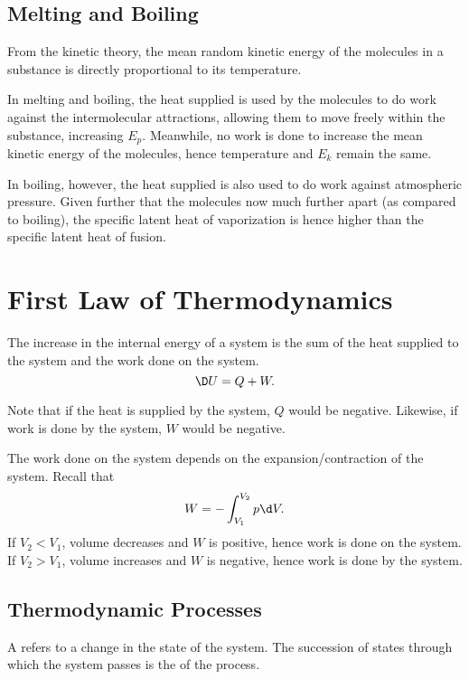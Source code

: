 \subsection{Melting and Boiling}

From the kinetic theory, the mean random kinetic energy of the molecules in a substance is directly proportional to its temperature.

In melting and boiling, the heat supplied is used by the molecules to do work against the intermolecular attractions, allowing them to move freely within the substance, increasing $E_p$. Meanwhile, no work is done to increase the mean kinetic energy of the molecules, hence temperature and $E_k$ remain the same.

In boiling, however, the heat supplied is also used to do work against atmospheric pressure. Given further that the molecules now much further apart (as compared to boiling), the specific latent heat of vaporization is hence higher than the specific latent heat of fusion.

\section{First Law of Thermodynamics}

\begin{law}
    The increase in the internal energy of a system is the sum of the heat supplied to the system and the work done on the system. \[\D U = Q + W.\]
\end{law}

Note that if the heat is supplied by the system, $Q$ would be negative. Likewise, if work is done by the system, $W$ would be negative.

The work done on the system depends on the expansion/contraction of the system. Recall that \[W = -\int_{V_1}^{V_2} p \d V.\] If $V_2 < V_1$, volume decreases and $W$ is positive, hence work is done on the system. If $V_2 > V_1$, volume increases and $W$ is negative, hence work is done by the system.

\subsection{Thermodynamic Processes}

\begin{definition}
    A  refers to a change in the state of the system. The succession of states through which the system passes is the  of the process.
\end{definition}

